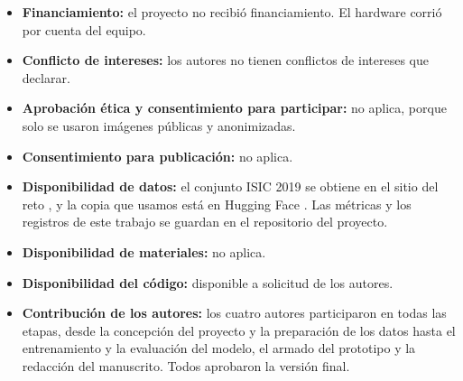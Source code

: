 \documentclass[pdflatex,sn-mathphys-num]{sn-jnl}%
\theoremstyle{thmstyleone}%
\theoremstyle{thmstyletwo}%
\theoremstyle{thmstylethree}%
\begin{document}
\begin{itemize}
\item \textbf{Financiamiento:} el proyecto no recibió financiamiento. El hardware corrió por cuenta del equipo.
\item \textbf{Conflicto de intereses:} los autores no tienen conflictos de intereses que declarar.
\item \textbf{Aprobación ética y consentimiento para participar:} no aplica, porque solo se usaron imágenes públicas y anonimizadas.
\item \textbf{Consentimiento para publicación:} no aplica.
\item \textbf{Disponibilidad de datos:} el conjunto ISIC 2019 se obtiene en el sitio del reto \cite{isic2019datos}, y la copia que usamos está en Hugging Face \cite{hf_isic2019}. Las métricas y los registros de este trabajo se guardan en el repositorio del proyecto.
\item \textbf{Disponibilidad de materiales:} no aplica.
\item \textbf{Disponibilidad del código:} disponible a solicitud de los autores.
\item \textbf{Contribución de los autores:} los cuatro autores participaron en todas las etapas, desde la concepción del proyecto y la preparación de los datos hasta el entrenamiento y la evaluación del modelo, el armado del prototipo y la redacción del manuscrito. Todos aprobaron la versión final.
\end{itemize}
\end{document}

